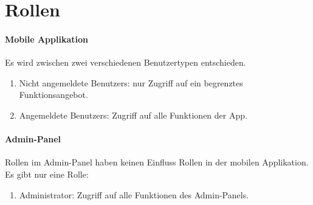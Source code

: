 \section{Rollen}

\paragraph{Mobile Applikation}
Es wird zwischen zwei verschiedenen \Gls{Benutzer}typen entschieden.
\begin{enumerate}
    \item Nicht angemeldete \Glspl{Benutzer}: nur Zugriff auf ein begrenztes Funktionsangebot.
    \item Angemeldete \Glspl{Benutzer}: Zugriff auf alle Funktionen der App.
\end{enumerate}

\paragraph{Admin-Panel}
Rollen im \Gls{Admin-Panel} haben keinen Einfluss Rollen in der mobilen Applikation.
Es gibt nur eine Rolle:
\begin{enumerate}
    \item \Gls{Administrator}: Zugriff auf alle Funktionen des \Gls{Admin-Panel}s.
\end{enumerate}
